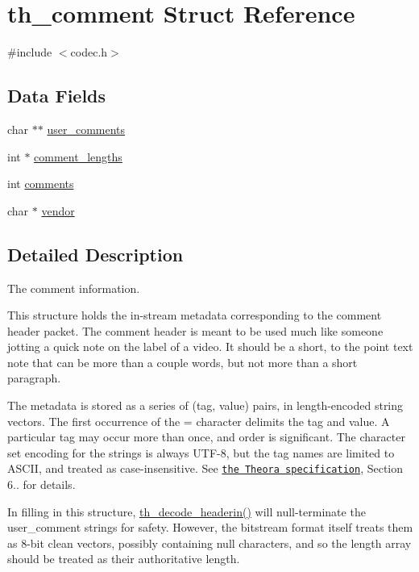 \hypertarget{structth__comment}{}\section{th\+\_\+comment Struct Reference}
\label{structth__comment}


{\ttfamily \#include $<$codec.\+h$>$}

\subsection*{Data Fields}
\begin{DoxyCompactItemize}
\item 
char $\ast$$\ast$ \hyperlink{structth__comment_ad72830e183e707bb0df423eb73b00de4}{user\+\_\+comments}
\item 
int $\ast$ \hyperlink{structth__comment_a723dc6fdf75757e70e28eea864b10898}{comment\+\_\+lengths}
\item 
int \hyperlink{structth__comment_a5990c34932376f070ad0fc314daaeb78}{comments}
\item 
char $\ast$ \hyperlink{structth__comment_a93fbe894d23603f56843be15b0cbdba0}{vendor}
\end{DoxyCompactItemize}


\subsection{Detailed Description}
The comment information.

This structure holds the in-\/stream metadata corresponding to the \textquotesingle{}comment\textquotesingle{} header packet. The comment header is meant to be used much like someone jotting a quick note on the label of a video. It should be a short, to the point text note that can be more than a couple words, but not more than a short paragraph.

The metadata is stored as a series of (tag, value) pairs, in length-\/encoded string vectors. The first occurrence of the \textquotesingle{}=\textquotesingle{} character delimits the tag and value. A particular tag may occur more than once, and order is significant. The character set encoding for the strings is always U\+T\+F-\/8, but the tag names are limited to A\+S\+C\+II, and treated as case-\/insensitive. See \href{http://www.theora.org/doc/Theora.pdf}{\tt the Theora specification}, Section 6.. for details.

In filling in this structure, \hyperlink{group__decfuncs_ga006d01d36fbe64768c571e6a12b7fc50}{th\+\_\+decode\+\_\+headerin()} will null-\/terminate the user\+\_\+comment strings for safety. However, the bitstream format itself treats them as 8-\/bit clean vectors, possibly containing null characters, and so the length array should be treated as their authoritative length. 

